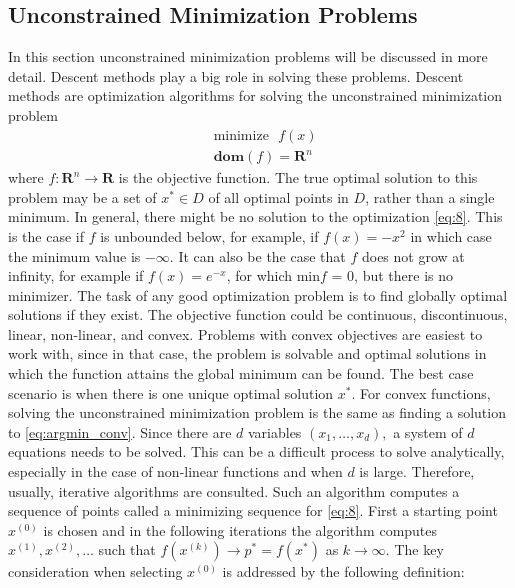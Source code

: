 \subsection{Unconstrained Minimization Problems}
In this section unconstrained minimization problems will be discussed in more detail. Descent methods play a big role in solving these problems. Descent methods are optimization algorithms for solving the unconstrained minimization problem 
\begin{equation*}\label{eq:8}\tag{2.3.1}
\begin{aligned}
    &\text{minimize} \text{ } f(x)\\ 
    &\textbf{dom} (f) = \mathbf{R}^n
\end{aligned}
\end{equation*}
where $f: \mathbf{R}^{n} \longrightarrow \mathbf{R}$ is the objective function. The true optimal solution to this problem may be a set of $x^{*} \in D$ of all optimal points in $D$, rather than a single minimum. In general, there might be no solution to the optimization \eqref{eq:8}. This is the case if $f$ is unbounded below, for example, if $f(x) = -x^{2}$ in which case the minimum value is $-\infty.$ It can also be the case that $f$ does not grow at infinity, for example if $f(x) = e^{-x}$, for which min$f$ = 0, but there is no minimizer. The task of any good optimization problem is to find globally optimal solutions if they exist. The objective function could be continuous, discontinuous, linear, non-linear, and convex. Problems with convex objectives are easiest to work with, since in that case, the problem is solvable and optimal solutions in which the function attains the global minimum can be found. The best case scenario is when there is one unique optimal solution $x^{*}$. For convex functions, solving the unconstrained minimization problem is the same as finding a solution to \eqref{eq:argmin_conv}. Since there are $d$ variables $(x_{1},\ldots,x_{d}),$ a system of $d$ equations needs to be solved. This can be a difficult process to solve analytically, especially in the case of non-linear functions and when $d$ is large. Therefore, usually, iterative algorithms are consulted. Such an algorithm computes a sequence of points called a minimizing sequence for \ref{eq:8}. First a starting point $x^{(0)}$ is chosen and in the following iterations the algorithm computes $x^{(1)}, x^{(2)},\ldots$ such that $f(x^{(k)}) \longrightarrow p^{*}=f(x^{*})$ as $k \longrightarrow \infty$. The key consideration when selecting $x^{(0)}$ is addressed by the following definition:
